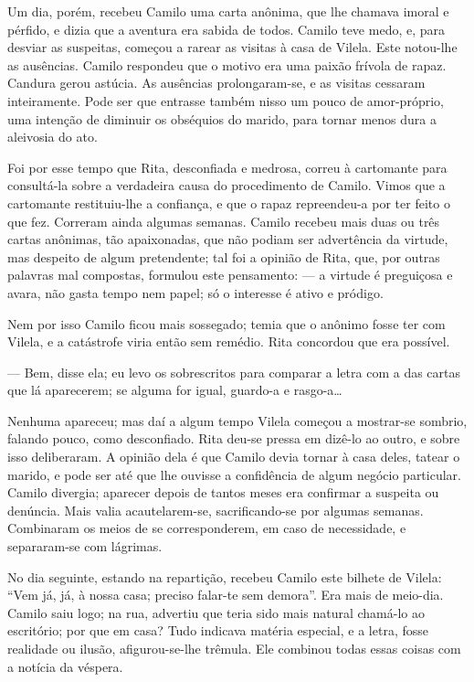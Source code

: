 Um dia, porém, recebeu Camilo uma carta anônima, que lhe chamava imoral
e pérfido, e dizia que a aventura era sabida de todos. Camilo teve medo,
e, para desviar as suspeitas, começou a rarear as visitas à casa de
Vilela. Este notou-lhe as ausências. Camilo respondeu que o motivo era
uma paixão frívola de rapaz. Candura gerou astúcia. As ausências
prolongaram-se, e as visitas cessaram inteiramente. Pode ser que
entrasse também nisso um pouco de amor-próprio, uma intenção de diminuir
os obséquios do marido, para tornar menos dura a aleivosia do ato.

Foi por esse tempo que Rita, desconfiada e medrosa, correu à cartomante
para consultá-la sobre a verdadeira causa do procedimento de Camilo.
Vimos que a cartomante restituiu-lhe a confiança, e que o rapaz
repreendeu-a por ter feito o que fez. Correram ainda algumas semanas.
Camilo recebeu mais duas ou três cartas anônimas, tão apaixonadas, que
não podiam ser advertência da virtude, mas despeito de algum
pretendente; tal foi a opinião de Rita, que, por outras palavras mal
compostas, formulou este pensamento: --- a virtude é preguiçosa e avara,
não gasta tempo nem papel; só o interesse é ativo e pródigo.

Nem por isso Camilo ficou mais sossegado; temia que o anônimo fosse ter
com Vilela, e a catástrofe viria então sem remédio. Rita concordou que
era possível.

--- Bem, disse ela; eu levo os sobrescritos para comparar a letra com a
das cartas que lá aparecerem; se alguma for igual, guardo-a e
rasgo-a\ldots{}

Nenhuma apareceu; mas daí a algum tempo Vilela começou a mostrar-se
sombrio, falando pouco, como desconfiado. Rita deu-se pressa em dizê-lo
ao outro, e sobre isso deliberaram. A opinião dela é que Camilo devia
tornar à casa deles, tatear o marido, e pode ser até que lhe ouvisse a
confidência de algum negócio particular. Camilo divergia; aparecer
depois de tantos meses era confirmar a suspeita ou denúncia. Mais valia
acautelarem-se, sacrificando-se por algumas semanas. Combinaram os meios
de se corresponderem, em caso de necessidade, e separaram-se com
lágrimas.

No dia seguinte, estando na repartição, recebeu Camilo este bilhete de
Vilela: ``Vem já, já, à nossa casa; preciso falar-te sem demora''. Era
mais de meio-dia. Camilo saiu logo; na rua, advertiu que teria sido mais
natural chamá-lo ao escritório; por que em casa? Tudo indicava matéria
especial, e a letra, fosse realidade ou ilusão, afigurou-se-lhe trêmula.
Ele combinou todas essas coisas com a notícia da véspera.

